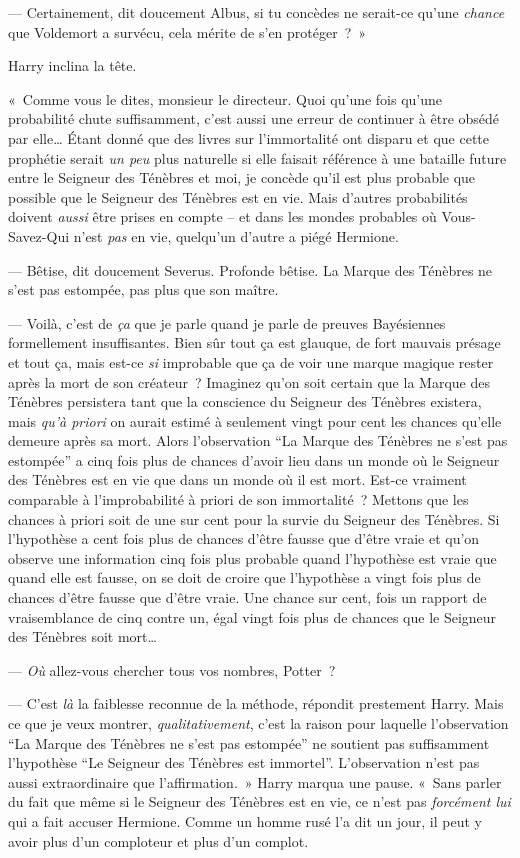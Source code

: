 --- Certainement, dit doucement Albus, si tu concèdes ne serait-ce qu'une \emph{chance} que Voldemort a survécu, cela mérite de s'en protéger~?~»

Harry inclina la tête.

«~Comme vous le dites, monsieur le directeur. Quoi qu'une fois qu'une probabilité chute suffisamment, c'est aussi une erreur de continuer à être obsédé par elle… Étant donné que des livres sur l'immortalité ont disparu et que cette prophétie serait \emph{un peu} plus naturelle si elle faisait référence à une bataille future entre le Seigneur des Ténèbres et moi, je concède qu'il est plus probable que possible que le Seigneur des Ténèbres est en vie. Mais d'autres probabilités doivent \emph{aussi} être prises en compte -- et dans les mondes probables où Vous-Savez-Qui n'est \emph{pas} en vie, quelqu'un d'autre a piégé Hermione.

--- Bêtise, dit doucement Severus. Profonde bêtise. La Marque des Ténèbres ne s'est pas estompée, pas plus que son maître.

--- Voilà, c'est de \emph{ça} que je parle quand je parle de preuves Bayésiennes formellement insuffisantes. Bien sûr tout ça est glauque, de fort mauvais présage et tout ça, mais est-ce \emph{si} improbable que ça de voir une marque magique rester après la mort de son créateur~? Imaginez qu'on soit certain que la Marque des Ténèbres persistera tant que la conscience du Seigneur des Ténèbres existera, mais \emph{qu'à priori} on aurait estimé à seulement vingt pour cent les chances qu'elle demeure après sa mort. Alors l'observation “La Marque des Ténèbres ne s'est pas estompée” a cinq fois plus de chances d'avoir lieu dans un monde où le Seigneur des Ténèbres est en vie que dans un monde où il est mort. Est-ce vraiment comparable à l'improbabilité à priori de son immortalité~? Mettons que les chances à priori soit de une sur cent pour la survie du Seigneur des Ténèbres. Si l'hypothèse a cent fois plus de chances d'être fausse que d'être vraie et qu'on observe une information cinq fois plus probable quand l'hypothèse est vraie que quand elle est fausse, on se doit de croire que l'hypothèse a vingt fois plus de chances d'être fausse que d'être vraie. Une chance sur cent, fois un rapport de vraisemblance de cinq contre un, égal vingt fois plus de chances que le Seigneur des Ténèbres soit mort…

--- \emph{Où} allez-vous chercher tous vos nombres, Potter~?

--- C'est \emph{là} la faiblesse reconnue de la méthode, répondit prestement Harry. Mais ce que je veux montrer, \emph{qualitativement}, c'est la raison pour laquelle l'observation “La Marque des Ténèbres ne s'est pas estompée” ne soutient pas suffisamment l'hypothèse “Le Seigneur des Ténèbres est immortel”. L'observation n'est pas aussi extraordinaire que l'affirmation.~» Harry marqua une pause. «~Sans parler du fait que même si le Seigneur des Ténèbres est en vie, ce n'est pas \emph{forcément lui} qui a fait accuser Hermione. Comme un homme rusé l'a dit un jour, il peut y avoir plus d'un comploteur et plus d'un complot.

